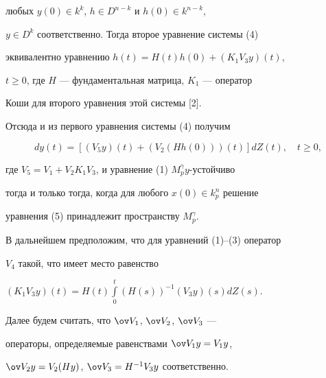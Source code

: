 любых $y(0) \in k^k$, $h \in D^{n-k}$ и $h(0) \in k^{n-k}$, 


$y \in D^k$ соответственно. Тогда второе уравнение системы (4) 


эквивалентно уравнению $h(t) = H(t)h(0) + (K_1V_3y)(t)$, 


$t \ge 0$, где $H$ --- фундаментальная матрица, $K_1$ --- оператор 


Коши для второго уравнения этой системы [2].


Отсюда и из первого уравнения системы (4) получим 


\begin{equation}


dy(t) = [(V_5y)(t) + (V_2(Hh(0)))(t)]dZ(t),\quad t \ge 0, 


\end{equation}


где $V_5 = V_1 + V_2K_1V_3$, и уравнение (1) $M_p^\gamma y$-устойчиво 


тогда и только тогда, когда для любого $x(0) \in k_p^n$ решение 


уравнения (5) принадлежит пространству $M_p^\gamma$. 





В дальнейшем предположим, что для уравнений (1)--(3) оператор 


$V_4$ такой, что имеет место равенство 


$(K_1V_3y)(t) = H(t)\int \limits_0^t(H(s))^{-1}(V_3y)(s)dZ(s)$. 


Далее будем считать, что $\ov V_1$, $\ov V_2$, $\ov V_3$ --- 


операторы, определяемые равенствами $\ov V_1y = V_1y$, 


$\ov V_2y = V_2(Hy)$, $\ov V_3 = H^{-1}V_3y$ соответственно.





